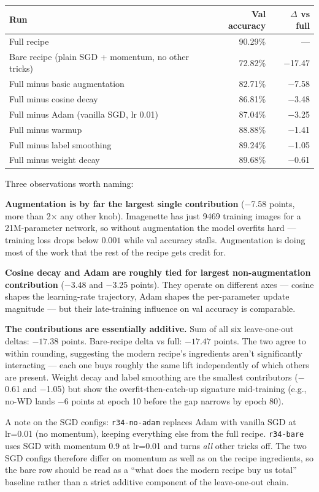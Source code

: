 \begin{center}
\begin{tabular}{l r r}
\hline
Run & Val accuracy & $\Delta$ vs full \\
\hline
Full recipe             & 90.29\% & --- \\
Bare recipe (plain SGD + momentum, no other tricks) & 72.82\% & $-$17.47 \\
Full minus basic augmentation & 82.71\% & $-$7.58 \\
Full minus cosine decay & 86.81\% & $-$3.48 \\
Full minus Adam (vanilla SGD, lr 0.01) & 87.04\% & $-$3.25 \\
Full minus warmup       & 88.88\% & $-$1.41 \\
Full minus label smoothing & 89.24\% & $-$1.05 \\
Full minus weight decay & 89.68\% & $-$0.61 \\
\hline
\end{tabular}
\end{center}

Three observations worth naming:

\textbf{Augmentation is by far the largest single contribution}
($-$7.58 points, more than 2$\times$ any other knob). Imagenette
has just 9469 training images for a 21M-parameter network, so
without augmentation the model overfits hard --- training loss
drops below $0.001$ while val accuracy stalls. Augmentation is
doing most of the work that the rest of the recipe gets credit
for.

\textbf{Cosine decay and Adam are roughly tied for largest
non-augmentation contribution} ($-$3.48 and $-$3.25 points). They
operate on different axes --- cosine shapes the learning-rate
trajectory, Adam shapes the per-parameter update magnitude --- but
their late-training influence on val accuracy is comparable.

\textbf{The contributions are essentially additive.} Sum of all
six leave-one-out deltas: $-17.38$ points. Bare-recipe delta vs
full: $-17.47$ points. The two agree to within rounding, suggesting
the modern recipe's ingredients aren't significantly interacting ---
each one buys roughly the same lift independently of which others
are present. Weight decay and label smoothing are the smallest
contributors ($-$0.61 and $-$1.05) but show the
overfit-then-catch-up signature mid-training (e.g., no-WD lands
$-$6 points at epoch 10 before the gap narrows by epoch 80).

A note on the SGD configs: \texttt{r34-no-adam} replaces Adam with
vanilla SGD at lr=0.01 (no momentum), keeping everything else from
the full recipe. \texttt{r34-bare} uses SGD with momentum 0.9 at
lr=0.01 and turns \emph{all} other tricks off. The two SGD configs
therefore differ on momentum as well as on the recipe ingredients,
so the bare row should be read as a ``what does the modern recipe
buy us total'' baseline rather than a strict additive component of
the leave-one-out chain.

